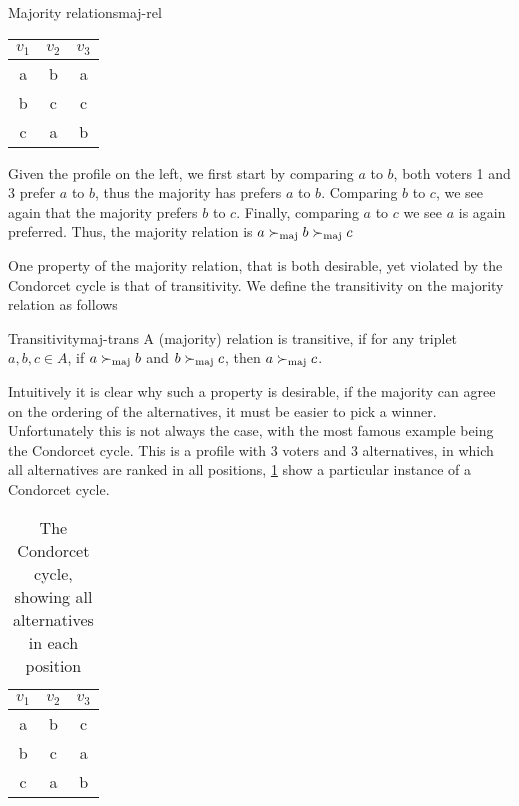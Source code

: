 \begin{example}{Majority relations}{maj-rel}
	\begin{minipage}{0.15\linewidth}
		\begin{tabular}{ccc}
			\toprule
			$v_1$ & $v_2$ & $v_3$ \\
			\midrule
			a & b & a \\
			b & c & c \\
			c & a & b \\
			\bottomrule
		\end{tabular}
	\end{minipage}
	\hspace{2em}
	\begin{minipage}{0.70\linewidth}
		Given the profile on the left, we first start by comparing $a$ to $b$, both voters 1 and 3 prefer $a$ to $b$, thus the majority has prefers $a$ to $b$. Comparing $b$ to $c$, we see again that the majority prefers $b$ to $c$. Finally, comparing $a$ to $c$ we see $a$ is again preferred. Thus, the majority relation is $a \succ_{\text{maj}} b \succ_{\text{maj}} c$
	\end{minipage}
\end{example}

One property of the majority relation, that is both desirable, yet violated by the Condorcet cycle is that of transitivity. We define the transitivity on the majority relation as follows

\begin{definition}{Transitivity}{maj-trans}
	A (majority) relation is transitive, if for any triplet $a, b, c \in A$, if $a \succ_{\text{maj}} b$ and $b \succ_{\text{maj}} c$, then $a \succ_{\text{maj}} c$.
\end{definition}

Intuitively it is clear why such a property is desirable, if the majority can agree on the ordering of the alternatives, it must be easier to pick a winner. Unfortunately this is not always the case, with the most famous example being the Condorcet cycle. This is a profile with 3 voters and 3 alternatives, in which all alternatives are ranked in all positions, \cref{tab: Condorcet} show a particular instance of a Condorcet cycle.

 
\begin{table}[h]
\centering
\begin{tabular}{ccc}
	\toprule
	$v_1$ & $v_2$ & $v_3$ \\
	\midrule
	a & b & c \\
	b & c & a \\
	c & a & b \\
	\bottomrule
\end{tabular}
	\caption{The Condorcet cycle, showing all alternatives in each position}
	\label{tab: Condorcet}
\end{table}

